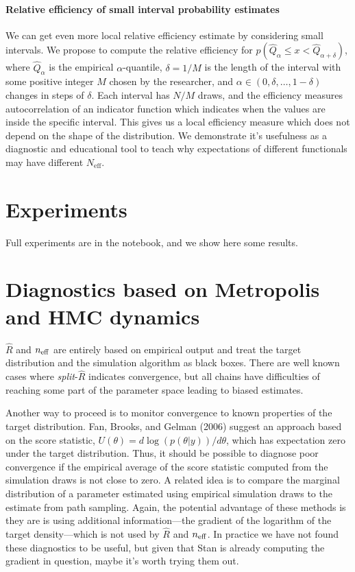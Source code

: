\documentclass[11pt]{article}
\begin{document}
\paragraph{Relative efficiency of small interval probability estimates}

We can get even more local relative efficiency estimate by considering small intervals. We propose to compute the relative efficiency for $p(\hat{Q}_\alpha
\le x < \hat{Q}_{\alpha+\delta})$, where $\hat{Q}_\alpha$ is the empirical
$\alpha$-quantile, $\delta=1/M$ is the length of the interval with some
positive integer $M$ chosen by the researcher, and $\alpha \in (0,\delta,\ldots,1-\delta)$ changes in steps of $\delta$. 
Each interval has $N/M$ draws, and the efficiency measures 
autocorrelation of an indicator function which
indicates when the values are inside the specific interval. This gives
us a local efficiency measure which does not depend on the shape of the
distribution. We demonstrate it's usefulness as a diagnostic and
educational tool to teach why expectations of different
functionals may have different $N_{\mbox{eff}}$.

\section{Experiments}

Full experiments are in the notebook, and we show here some results.

\section{Diagnostics based on Metropolis and HMC dynamics}

$\widehat{R}$ and $n_{\rm eff}$ are entirely based on empirical output and treat the target distribution and the simulation algorithm as black boxes. There are well known cases where {\em split}-$\widehat{R}$ indicates convergence, but all chains have difficulties of reaching some part of the parameter space leading to biased estimates.

Another way to proceed is to monitor convergence to known properties of the target distribution.  Fan, Brooks, and Gelman (2006) suggest an approach based on the score statistic, $U(\theta) = d\log(p(\theta|y))/d\theta$, which has expectation zero under the target distribution.  Thus, it should be possible to diagnose poor convergence if the empirical average of the score statistic computed from the simulation draws is not close to zero.  A related idea is to compare the marginal distribution of a parameter estimated using empirical simulation draws to the estimate from path sampling.  Again, the potential advantage of these methods is they are is using additional information---the gradient of the logarithm of the target density---which is not used by $\widehat{R}$ and $n_{\rm eff}$.  In practice we have not found these diagnostics to be useful, but given that Stan is already computing the gradient in question, maybe it's worth trying them out.
\end{document}

